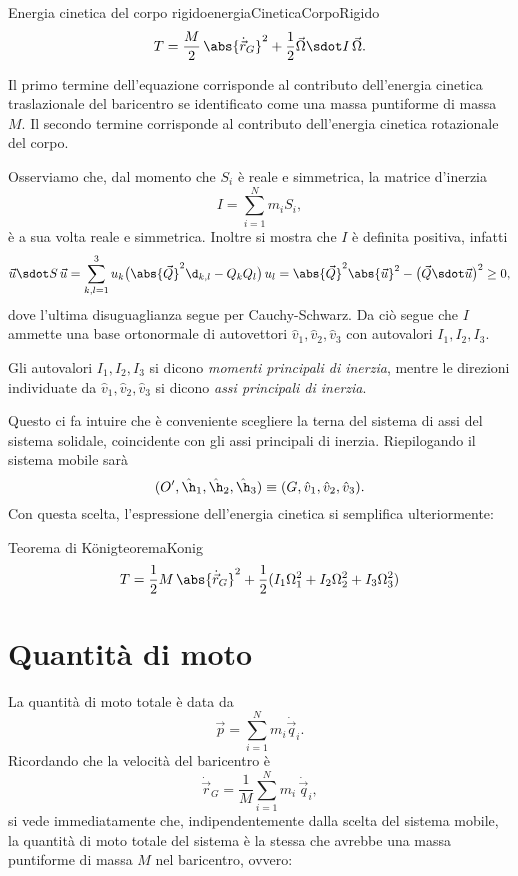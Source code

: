 \begin{remark}{Energia cinetica del corpo rigido}{energiaCineticaCorpoRigido}
	\[
		T = \frac{M}{2}\,\abs{\dot{\vec{r}}_G}^2 + \frac{1}{2}\vec{\Omega} \sdot I\,\vec{\Omega}.
	\]
\end{remark}
%
%
Il primo termine dell'equazione corrisponde al contributo dell'energia cinetica traslazionale del baricentro se identificato come una massa puntiforme di massa \(M\). Il secondo termine corrisponde al contributo dell'energia cinetica rotazionale del corpo.

Osserviamo che, dal momento che \(S_i\) è reale e simmetrica, la matrice d'inerzia
\[
	I = \sum_{i=1}^N m_i S_i,
\]
è a sua volta reale e simmetrica. Inoltre si mostra che \(I\) è definita positiva, infatti
\[
	\vec{u} \sdot S\,\vec{u} = \sum_{k,l=1}^3 u_k \big(\abs{\vec{Q}}^2 \d_{k,l}-Q_k Q_l\big)\,u_l = \abs{\vec{Q}}^2 \abs{\vec{u}}^2 - \big(\vec{Q} \sdot \vec{u}\big)^2 \ge 0,
\]
dove l'ultima disuguaglianza segue per Cauchy-Schwarz.
Da ciò segue che \(I\) ammette una base ortonormale di autovettori \(\hat{v}_1,\hat{v}_2,\hat{v}_3\) con autovalori \(I_1,I_2,I_3\).

\begin{notz}
	Gli autovalori \(I_1,I_2,I_3\) si dicono \emph{momenti principali di inerzia}, mentre le direzioni individuate da \(\hat{v}_1,\hat{v}_2,\hat{v}_3\) si dicono \emph{assi principali di inerzia}.
\end{notz}
\noindent
Questo ci fa intuire che è conveniente scegliere la terna del sistema di assi del sistema solidale, coincidente con gli assi principali di inerzia. Riepilogando il sistema mobile sarà
\[
	(O',\hat{\h}_1, \hat{\h}_2, \hat{\h}_3) \equiv (G, \hat{v}_1,\hat{v}_2,\hat{v}_3).
\]
Con questa scelta, l'espressione dell'energia cinetica si semplifica ulteriormente:

\begin{remark}{Teorema di K\"onig}{teoremaKonig}
	\[
		T = \frac{1}{2}M\,\abs{\dot{\vec{r}}_G}^2 + \frac{1}{2}(I_1\Omega_1^2+I_2\Omega_2^2+I_3\Omega_3^2)
	\]
\end{remark}

\section{Quantità di moto}

La quantità di moto totale è data da
\[
	\vec{p} = \sum_{i=1}^N m_i \dot{\vec{q}}_i.
\]
Ricordando che la velocità del baricentro è
\[
	\dot{\vec{r}}_G = \frac{1}{M}\sum_{i=1}^N m_i\,\dot{\vec{q}}_i,
\]
si vede immediatamente che, indipendentemente dalla scelta del sistema mobile, la quantità di moto totale del sistema è la stessa che avrebbe una massa puntiforme di massa \(M\) nel baricentro, ovvero:

